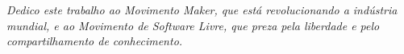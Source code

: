 \begin{dedicatoria}
   \vspace*{\fill}
   \centering
   \noindent
   \textit{Dedico este trabalho ao Movimento Maker, que está revolucionando a indústria mundial, e ao
   Movimento de Software Livre, que preza pela liberdade e pelo compartilhamento de conhecimento.
   }\vspace*{\fill}
\end{dedicatoria}
